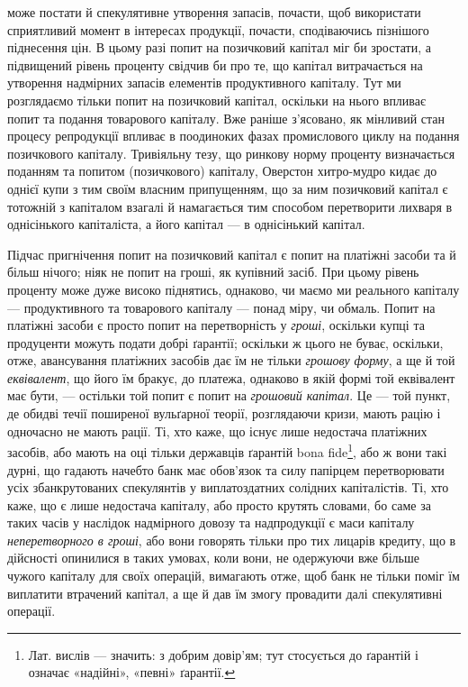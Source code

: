 \parcont{}  %
може постати й спекулятивне утворення запасів, почасти, щоб використати сприятливий
момент в інтересах продукції, почасти, сподіваючись пізнішого піднесення
цін. В цьому разі попит на позичковий капітал міг би зростати, а підвищений
рівень проценту свідчив би про те, що капітал витрачається на утворення
надмірних запасів елементів продуктивного капіталу. Тут ми розглядаємо
тільки попит на позичковий капітал, оскільки на нього впливає попит та
подання товарового капіталу. Вже раніше з’ясовано, як мінливий стан процесу
репродукції впливає в поодиноких фазах промислового циклу на подання позичкового
капіталу. Тривіяльну тезу, що ринкову норму проценту визначається
поданням та попитом (позичкового) капіталу, Оверстон хитро-мудро кидає до
однієї купи з тим своїм власним припущенням, що за ним позичковий капітал
є тотожній з капіталом взагалі й намагається тим способом перетворити лихваря
в однісінького капіталіста, а його капітал — в однісінький капітал.

Підчас пригнічення попит на позичковий капітал є попит на платіжні засоби
та й більш нічого; ніяк не попит на гроші, як купівний засіб. При цьому
рівень проценту може дуже високо піднятись, однаково, чи маємо ми реального
капіталу — продуктивного та товарового капіталу — понад міру, чи обмаль.
Попит на платіжні засоби є просто попит на перетворність у \emph{гроші}, оскільки
купці та продуценти можуть подати добрі ґарантії; оскільки ж цього не буває,
оскільки, отже, авансування платіжних засобів дає їм не тільки \emph{грошову}
\emph{форму}, а ще й той \emph{еквівалент}, що його їм бракує, до платежа, однаково в якій
формі той еквівалент має бути, — остільки той попит є попит на \emph{грошовий капітал}.
Це — той пункт, де обидві течії поширеної вульґарної теорії, розглядаючи
кризи, мають рацію і одночасно не мають рації. Ті, хто каже, що існує лише недостача
платіжних засобів, або мають на оці тільки державців ґарантій bona
fide\footnote{
Лат. вислів — значить: з добрим довір’ям; тут стосується до ґарантій і означає
«надійні», «певні» ґарантії. 
}, або ж вони такі дурні, що гадають начебто банк має обов’язок та силу
папірцем перетворювати усіх збанкрутованих спекулянтів у виплатоздатних солідних
капіталістів. Ті, хто каже, що є лише недостача капіталу, або просто
крутять словами, бо саме за таких часів у наслідок надмірного довозу та надпродукції
є маси капіталу \emph{неперетворного в гроші}, або вони говорять тільки
про тих лицарів кредиту, що в дійсності опинилися в таких умовах, коли вони,
не одержуючи вже більше чужого капіталу для своїх операцій, вимагають
отже, щоб банк не тільки поміг їм виплатити втрачений капітал, а ще й дав
їм змогу провадити далі спекулятивні операції.

